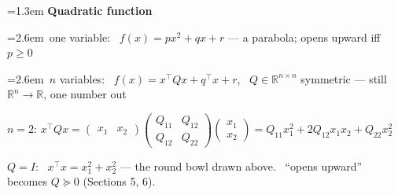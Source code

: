 \documentclass[10pt]{article}
\newenvironment{board}{%
  \par\vspace{4pt}
  \begingroup\leftskip=1.3em\relax\parskip=2pt\relax}{%
  \par\endgroup\vspace{4pt}}
\newcommand{\bul}{\hangindent=2.6em\hangafter=1\hspace{1.2em}\textbullet\ \ignorespaces}
\begin{document}
\begin{board}
\textbf{Quadratic function}
\vspace{4pt}

\bul one variable: \ $f(x) = px^2 + qx + r$ \quad --- a parabola; opens upward iff $p \ge 0$
\vspace{4pt}

\bul $n$ variables: \ $f(x) = x^{\top}Qx + q^{\top}x + r$, \ $Q \in \mathbb{R}^{n \times n}$ symmetric
      \quad --- still $\mathbb{R}^n \to \mathbb{R}$, one number out
\vspace{4pt}

\qquad $n = 2$: \quad $x^{\top}Qx
  = \begin{pmatrix} x_1 & x_2 \end{pmatrix}
    \begin{pmatrix} Q_{11} & Q_{12} \\ Q_{12} & Q_{22} \end{pmatrix}
    \begin{pmatrix} x_1 \\ x_2 \end{pmatrix}
  = Q_{11}x_1^2 + 2Q_{12}x_1x_2 + Q_{22}x_2^2$
\vspace{4pt}

\qquad $Q = I$: \ $x^{\top}x = x_1^2 + x_2^2$ --- the round bowl drawn above.
\ ``opens upward'' becomes $Q \succeq 0$ (Sections 5, 6).
\end{board}
\end{document}
